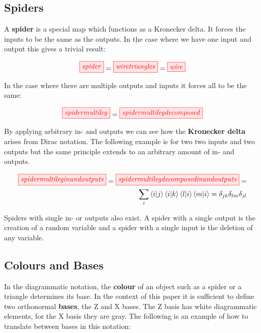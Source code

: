 \documentclass[]{article}
\begin{document}
\subsection{Spiders}
\label{spiders}

A \textbf{spider} is a special map which functions as a Kronecker delta. It forces the inputs to be the same as the outputs. In the case where we have one input and output this gives a trivial result:

\begin{equation}
\tikzfig{spider} = \tikzfig{wiretriangles} = \tikzfig{wire}
\end{equation}

In the case where there are multiple outputs and inputs it forces all to be the same:

\begin{equation}
\tikzfig{spidermultileg} = \tikzfig{spidermultilegdecomposed}
\end{equation}

By applying arbitrary in- and outputs we can see how the \textbf{Kronecker delta} arises from Dirac notation. The following example is for two two inputs and two outputs but the same principle extends to an arbitrary amount of in- and outputs.

\begin{equation}
\begin{split}
\tikzfig{spidermultileginandoutputs} = \tikzfig{spidermultilegdecomposedinandoutputs} = \\ \sum_{i} \bra{i}\ket{j}\bra{i}\ket{k}\bra{l}\ket{i}\bra{m}\ket{i} = \delta_{jk} \delta_{lm}  \delta_{jl}
\end{split}
\end{equation}

Spiders with single in- or outputs also exist. A spider with a single output is the creation of a random variable and a spider with a single input is the deletion of any variable.

\subsection{Colours and Bases}
\label{coloursandbases}

In the diagrammatic notation, the \textbf{colour} of an object such as a spider or a triangle determines its base. In the context of this paper it is sufficient to define two orthonormal \textbf{bases}, the Z and X bases. The Z basis has white diagrammatic elements, for the X basis they are gray. The following is an example of how to translate between bases in this notation:
\end{document}
